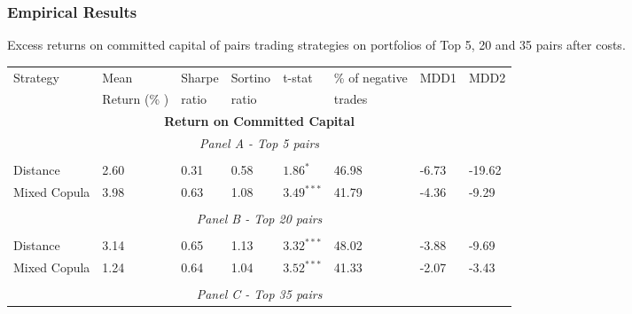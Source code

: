\documentclass[pdf,9pt,xcolor=dvipsnames,hide notes]{beamer}
\begin{document}
	
	
	\begin{frame}
		
		
		\frametitle{Empirical Results}
			\begin{threeparttable}[H]
			\centering \tiny
			\caption{Excess returns on committed capital of pairs trading strategies on portfolios of Top 5, 20 and 35 pairs after costs. }
			\begin{tabularx}{\textwidth}{@{\extracolsep{\fill}}llllllll@{}}
				\toprule
				Strategy & Mean  & Sharpe & Sortino & t-stat & \% of negative   & MDD1 & MDD2 \\
				& Return (\% ) & ratio &  ratio     &  &  trades     &       &  \\
				\midrule
				\multicolumn{8}{c}{\textbf{Return on Committed Capital}} \\
				\multicolumn{8}{c}{\textit{Panel A - Top 5 pairs}} \\
				&       &       &       &       &       &       &  \\
				Distance & 2.60  & 0.31  & 0.58  & $1.86^{*}$  & 46.98 & -6.73    & -19.62 \\
				Mixed Copula & \cellcolor{corn} 3.98  & \cellcolor{corn} 0.63  & 1.08  & \cellcolor{corn} $3.49^{***}$  & \cellcolor{corn} 41.79 & \cellcolor{corn} -4.36  & \cellcolor{corn} -9.29 \\
				\multicolumn{1}{r}{} & \multicolumn{1}{r}{} & \multicolumn{1}{r}{} & \multicolumn{1}{r}{} & \multicolumn{1}{r}{} & \multicolumn{1}{r}{} & \multicolumn{1}{r}{} & \multicolumn{1}{r}{} \\
				\multicolumn{8}{c}{\textit{Panel B - Top 20 pairs}} \\
				&       &       &       &       &       &       &  \\
				Distance & \cellcolor{celadon} 3.14  & \cellcolor{celadon} 0.65  & 1.13  & $3.32^{***}$  & 48.02 & -3.88  & -9.69 \\
				Mixed Copula  & 1.24  & 0.64  & 1.04  & $3.52^{***}$  & 41.33 & \cellcolor{corn} -2.07  & \cellcolor{corn} -3.43  \\
				\multicolumn{1}{r}{} & \multicolumn{1}{r}{} & \multicolumn{1}{r}{} & \multicolumn{1}{r}{} & \multicolumn{1}{r}{} & \multicolumn{1}{r}{} & \multicolumn{1}{r}{} & \multicolumn{1}{r}{} \\
				\multicolumn{8}{c}{\textit{Panel C - Top 35 pairs}} \\

\end{tabularx}
\end{threeparttable}
\end{frame}
\end{document}
